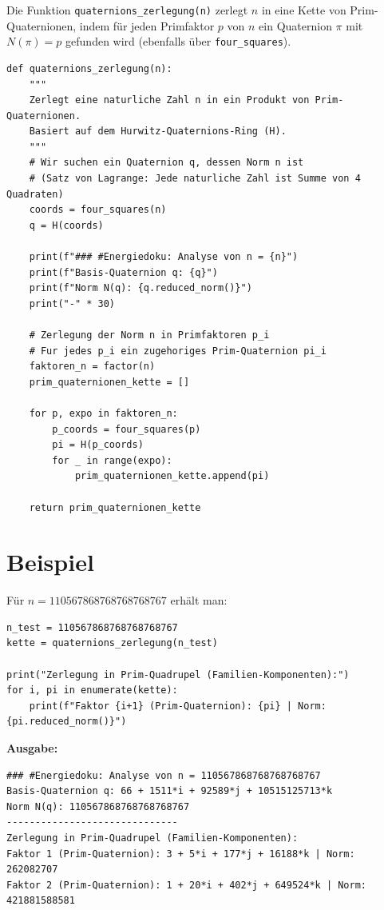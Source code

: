 \documentclass[11pt, a4paper]{article}
\begin{document}
Die Funktion \texttt{quaternions\_zerlegung(n)} zerlegt $n$ in eine Kette von Prim-Quaternionen, indem für jeden Primfaktor $p$ von $n$ ein Quaternion $\pi$ mit $N(\pi) = p$ gefunden wird (ebenfalls über \texttt{four\_squares}).

\begin{lstlisting}
def quaternions_zerlegung(n):
    """
    Zerlegt eine naturliche Zahl n in ein Produkt von Prim-Quaternionen.
    Basiert auf dem Hurwitz-Quaternions-Ring (H).
    """
    # Wir suchen ein Quaternion q, dessen Norm n ist
    # (Satz von Lagrange: Jede naturliche Zahl ist Summe von 4 Quadraten)
    coords = four_squares(n)
    q = H(coords)
    
    print(f"### #Energiedoku: Analyse von n = {n}")
    print(f"Basis-Quaternion q: {q}")
    print(f"Norm N(q): {q.reduced_norm()}")
    print("-" * 30)
    
    # Zerlegung der Norm n in Primfaktoren p_i
    # Fur jedes p_i ein zugehoriges Prim-Quaternion pi_i
    faktoren_n = factor(n)
    prim_quaternionen_kette = []
    
    for p, expo in faktoren_n:
        p_coords = four_squares(p)
        pi = H(p_coords)
        for _ in range(expo):
            prim_quaternionen_kette.append(pi)
            
    return prim_quaternionen_kette
\end{lstlisting}

\section{Beispiel}

Für $n = 110567868768768768767$ erhält man:

\begin{lstlisting}
n_test = 110567868768768768767
kette = quaternions_zerlegung(n_test)

print("Zerlegung in Prim-Quadrupel (Familien-Komponenten):")
for i, pi in enumerate(kette):
    print(f"Faktor {i+1} (Prim-Quaternion): {pi} | Norm: {pi.reduced_norm()}")
\end{lstlisting}

\textbf{Ausgabe:}
\begin{verbatim}
### #Energiedoku: Analyse von n = 110567868768768768767
Basis-Quaternion q: 66 + 1511*i + 92589*j + 10515125713*k
Norm N(q): 110567868768768768767
------------------------------
Zerlegung in Prim-Quadrupel (Familien-Komponenten):
Faktor 1 (Prim-Quaternion): 3 + 5*i + 177*j + 16188*k | Norm: 262082707
Faktor 2 (Prim-Quaternion): 1 + 20*i + 402*j + 649524*k | Norm: 421881588581
\end{verbatim}
\end{document}
